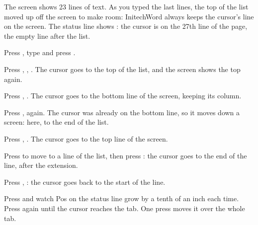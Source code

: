 \endgroup
\par\addvspace{4pt}
The screen shows 23 lines of text.  As you typed the last lines, the top of
the list moved up off the screen to make room: InitechWord always keeps the
cursor's line on the screen.
The status line shows : the cursor is on the 27th line of the
page, the empty line after the list.

\begin{WPSteps}
\item Press , type  and press
.
\end{WPSteps}

\begin{WPSteps}
\item Press , , .  The cursor goes
to the top of the list, and the screen shows the top again.
\item Press , .  The cursor goes to the bottom
line of the screen, keeping its column.
\end{WPSteps}
\begin{WPSteps}[resume]
\item Press ,  again.  The cursor was already on
the bottom line, so it moves down a screen: here, to the end of the list.
\item Press , .  The cursor goes to the top line of
the screen.
\end{WPSteps}

\begin{WPSteps}[resume]
\item Press  to move to a line of the list, then press
: the cursor goes to the end of the line, after the extension.
\item Press , : the cursor goes back to the start
of the line.
\item Press  and watch Pos on the status line grow by a tenth
of an inch each time.  Press  again until the cursor reaches
the tab.  One press moves it over the whole tab.
\end{WPSteps}

